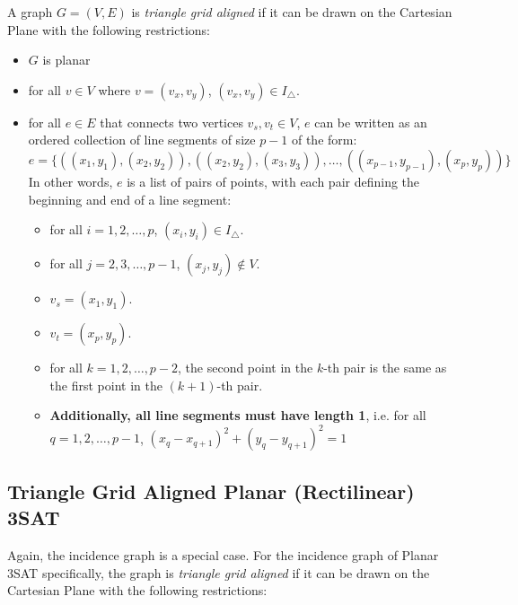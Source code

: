 A graph $G=(V,E)$ is \textit{triangle grid aligned} if it can be drawn on the Cartesian Plane with the following restrictions:
\begin{itemize}
    \item $G$ is planar
    \item for all $v \in V$ where $v = (v_x, v_y)$, $(v_x, v_y) \in I_{\triangle}$.
    \item for all $e \in E$ that connects two vertices $v_s, v_t \in V$, $e$ can be written as an ordered collection of line segments of size $p-1$ of the form:
    $$e = \{ \left( (x_1, y_1), (x_2, y_2) \right), \left( (x_2, y_2), (x_3, y_3) \right), \dots, \left( (x_{p-1}, y_{p-1}), (x_p, y_p) \right) \}$$
    In other words, $e$ is a list of pairs of points, with each pair defining the beginning and end of a line segment:
    \begin{itemize}[label=$\circ$]
        \item for all $i=1,2,\dots, p$, $(x_i, y_i) \in I_{\triangle}$.
        \item for all $j=2,3,\dots, p-1$, $(x_j, y_j) \notin V$.
        \item $v_s = (x_1, y_1)$.
        \item $v_t = (x_p, y_p)$.
        \item for all $k=1, 2, \dots, p-2$, the second point in the $k$-th pair is the same as the first point in the $(k+1)$-th pair.
        \item \textbf{Additionally, all line segments must have length 1}, i.e. \newline for all $q=1,2,\dots, p-1$, $(x_q - x_{q+1})^2 + (y_q - y_{q+1})^2 = 1$
    \end{itemize}
    
\end{itemize}

\subsection{Triangle Grid Aligned Planar (Rectilinear) 3SAT}

Again, the incidence graph is a special case. For the incidence graph of Planar 3SAT specifically, the graph is \textit{triangle grid aligned} if it can be drawn on the Cartesian Plane with the following restrictions:

